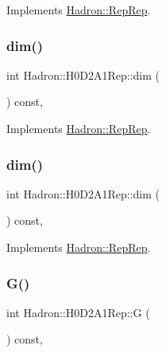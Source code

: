 Implements \mbox{\hyperlink{structHadron_1_1RepRep_a92c8802e5ed7afd7da43ccfd5b7cd92b}{Hadron\+::\+Rep\+Rep}}.

\mbox{\label{structHadron_1_1H0D2A1Rep_ab42f651512c7614de1f9eda51cfa51be}} 
\subsubsection{\texorpdfstring{dim()}{dim()}\hspace{0.1cm}{\footnotesize\ttfamily [2/3]}}
{\footnotesize\ttfamily int Hadron\+::\+H0\+D2\+A1\+Rep\+::dim (\begin{DoxyParamCaption}{ }\end{DoxyParamCaption}) const\hspace{0.3cm}{\ttfamily [inline]}, {\ttfamily [virtual]}}



Implements \mbox{\hyperlink{structHadron_1_1RepRep_a92c8802e5ed7afd7da43ccfd5b7cd92b}{Hadron\+::\+Rep\+Rep}}.

\mbox{\label{structHadron_1_1H0D2A1Rep_ab42f651512c7614de1f9eda51cfa51be}} 
\subsubsection{\texorpdfstring{dim()}{dim()}\hspace{0.1cm}{\footnotesize\ttfamily [3/3]}}
{\footnotesize\ttfamily int Hadron\+::\+H0\+D2\+A1\+Rep\+::dim (\begin{DoxyParamCaption}{ }\end{DoxyParamCaption}) const\hspace{0.3cm}{\ttfamily [inline]}, {\ttfamily [virtual]}}



Implements \mbox{\hyperlink{structHadron_1_1RepRep_a92c8802e5ed7afd7da43ccfd5b7cd92b}{Hadron\+::\+Rep\+Rep}}.

\mbox{\label{structHadron_1_1H0D2A1Rep_ae1ebac233a357e3e0be88511400434bc}} 
\subsubsection{\texorpdfstring{G()}{G()}\hspace{0.1cm}{\footnotesize\ttfamily [1/2]}}
{\footnotesize\ttfamily int Hadron\+::\+H0\+D2\+A1\+Rep\+::G (\begin{DoxyParamCaption}{ }\end{DoxyParamCaption}) const\hspace{0.3cm}{\ttfamily [inline]}, {\ttfamily [virtual]}}

